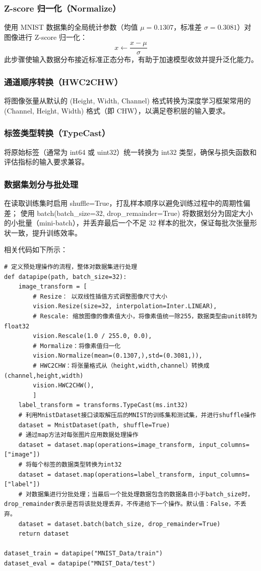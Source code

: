 \documentclass[12pt]{article}
\begin{document}
\subsubsection*{Z-score 归一化（Normalize）}
使用 MNIST 数据集的全局统计参数（均值 $\mu = 0.1307$，标准差 $\sigma = 0.3081$）对图像进行 Z-score 归一化：
\[
x \leftarrow \frac{x - \mu}{\sigma}
\]
此步骤使输入数据分布接近标准正态分布，有助于加速模型收敛并提升泛化能力。

\subsubsection*{通道顺序转换（HWC2CHW）}
将图像张量从默认的 (Height, Width, Channel) 格式转换为深度学习框架常用的 (Channel, Height, Width) 格式（即 CHW），以满足卷积层的输入要求。

\subsubsection*{标签类型转换（TypeCast）}
将原始标签（通常为 int64 或 uint32）统一转换为 int32 类型，确保与损失函数和评估指标的输入要求兼容。

\subsubsection*{数据集划分与批处理}
在读取训练集时启用 shuffle=True，打乱样本顺序以避免训练过程中的周期性偏差；
使用 batch(batch\_size=32, drop\_remainder=True) 将数据划分为固定大小的小批量（mini-batch），并丢弃最后一个不足 32 样本的批次，保证每批次张量形状一致，提升训练效率。

相关代码如下所示：
\begin{lstlisting}
# 定义预处理操作的流程，整体对数据集进行处理
def datapipe(path, batch_size=32):
    image_transform = [
        # Resize： 以双线性插值方式调整图像尺寸大小
        vision.Resize(size=32, interpolation=Inter.LINEAR),
        # Rescale: 缩放图像的像素值大小，将像素值统一除255，数据类型由unit8转为float32
        vision.Rescale(1.0 / 255.0, 0.0),
        # Mormalize：将像素值归一化
        vision.Normalize(mean=(0.1307,),std=(0.3081,)),
        # HWC2CHW：将张量格式从（height,width,channel）转换成(channel,height,width)
        vision.HWC2CHW(),
        ]
    label_transform = transforms.TypeCast(ms.int32)
    # 利用MnistDataset接口读取解压后的MNIST的训练集和测试集，并进行shuffle操作
    dataset = MnistDataset(path, shuffle=True)
    # 通过map方法对每张图片应用数据处理操作
    dataset = dataset.map(operations=image_transform, input_columns=["image"])
    # 将每个标签的数据类型转换为int32
    dataset = dataset.map(operations=label_transform, input_columns=["label"])
    # 对数据集进行分批处理；当最后一个批处理数据包含的数据条目小于batch_size时，drop_remainder表示是否将该批处理丢弃，不传递给下一个操作。默认值：False，不丢弃。
    dataset = dataset.batch(batch_size, drop_remainder=True)
    return dataset

dataset_train = datapipe("MNIST_Data/train")
dataset_eval = datapipe("MNIST_Data/test")
\end{lstlisting}
\end{document}
